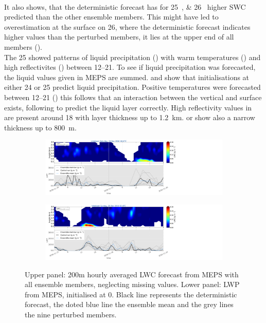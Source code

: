 \\
It also shows, that the deterministic forecast has for \SIlist{25;26}{\dec} higher SWC predicted than the other ensemble members. This might have led to overestimation at the surface on \SI{26}{\dec}, where the deterministic forecast indicates higher values than the perturbed members, it lies at the upper end of all members (). 
\\
The \SI{25}{\dec} showed patterns of liquid precipitation () with warm temperatures () and high reflectivites () between \SIrange{12}{21}{\UTC}. To see if liquid precipitation was forecasted, the liquid values given in MEPS are summed.  and  show that initialisations at either \SI{24}{\dec} or \SI{25}{\dec} predict liquid precipitation. 
Positive temperatures were forecasted between \SIrange{12}{21}{\UTC} () this follows that an interaction between the vertical and surface exists, following to predict the liquid layer correctly. 
High reflectivity values in  are present around \SI{18}{\UTC} with layer thickness up to \SI{1.2}{\km}.  or  show also a narrow thickness up to \SI{800}{\metre}. 
\begin{figure}[t]
	\centering
    \begin{subfigure}[b]{\textwidth}
    	\centering
        \includegraphics[trim={0.cm 1.9cm 26.5cm 0.4cm},clip,width=\textwidth]{./fig_vert_LWC_EM/20161224}
        \caption{}\label{fig:LWC:24}
    \end{subfigure}
    \begin{subfigure}[b]{\textwidth}
   		\centering
        \includegraphics[trim={0.cm 1.9cm 26.5cm 0.4cm},clip,width=\textwidth]{./fig_vert_LWC_EM/20161225}
        \caption{}\label{fig:LWC:25}
    \end{subfigure}
    \caption{Upper panel: 200m hourly averaged LWC forecast from MEPS with all ensemble members, neglecting missing values.
Lower panel: LWP from MEPS, initialised at \SI{0}{\UTC}. Black line represents the deterministic
forecast, the doted blue line the ensemble mean and the grey lines the nine perturbed
members.}\label{fig:res:obs_masc}
\end{figure}
